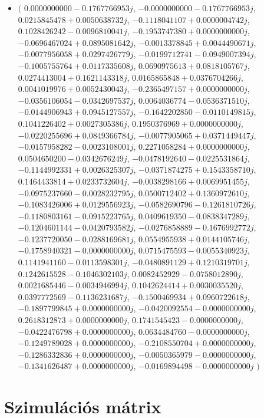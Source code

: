 \documentclass[14pt,a4paper]{article}
\begin{document}
\begin{itemize}
\item
$\big($
$0.0000000000-0.1767766953j$, $-0.0000000000-0.1767766953j$, $0.0215845478+0.0050638732j$, $-0.1118041107+0.0000004742j$, $0.1028426242-0.0096810041j$, $-0.1953747380+0.0000000000j$, $-0.0696467024+0.0895081642j$, $-0.0013378845+0.0044490671j$, $-0.0077956058+0.0297426779j$, $-0.0199712741-0.0949007394j$, $-0.1005755764+0.0117335608j$, $0.0690975613+0.0818105767j$, $0.0274413004+0.1621143318j$, $0.0165865848+0.0376704266j$, $0.0041019976+0.0052430043j$, $-0.2365497157+0.0000000000j$, $-0.0356106054-0.0342697537j$, $0.0064036774-0.0536371510j$, $-0.0144906943+0.0945127557j$, $-0.1642202850-0.0110149815j$, $0.1041226402+0.0027305386j$, $0.1950376969+0.0000000000j$, $-0.0220255696+0.0849366784j$, $-0.0077905065+0.0371449447j$, $-0.0157958282-0.0023108001j$, $0.2271058284+0.0000000000j$, $0.0504650200-0.0342676249j$, $-0.0478192640-0.0225531864j$, $-0.1144992331+0.0026325307j$, $-0.0371874275+0.1543358710j$, $0.1464433814+0.0233732604j$, $-0.0038298166+0.0069951455j$, $-0.0975237660-0.0028232795j$, $0.0500712402+0.1360972610j$, $-0.1083426006+0.0129556923j$, $-0.0582690796-0.1261810726j$, $-0.1180803161-0.0915223765j$, $0.0409619350-0.0838347289j$, $-0.1204601144-0.0420793582j$, $-0.0276858889-0.1676992772j$, $-0.1237720050-0.0288169681j$, $0.0554955938+0.0144105746j$, $-0.1758940321-0.0000000000j$, $0.0715475593-0.0055340923j$, $0.1141941160-0.0113598301j$, $-0.0480891129+0.1210319701j$, $0.1242615528-0.1046302103j$, $0.0082452929-0.0758012890j$, $0.0021685446-0.0034946994j$, $0.1042624414+0.0030035520j$, $0.0397772569-0.1136231687j$, $-0.1500469934+0.0960722618j$, $-0.1897799845+0.0000000000j$, $-0.0420092554-0.0000000000j$, $0.2618312873+0.0000000000j$, $0.1741545423-0.0000000000j$, $-0.0422476798+0.0000000000j$, $0.0634484760-0.0000000000j$, $-0.1249789028+0.0000000000j$, $-0.2108550704+0.0000000000j$, $-0.1286332836+0.0000000000j$, $-0.0050365979-0.0000000000j$, $-0.1341626487+0.0000000000j$, $-0.0169894498-0.0000000000j$
$\big)$
\end{itemize}
\section{Szimulációs mátrix}
\end{document}
